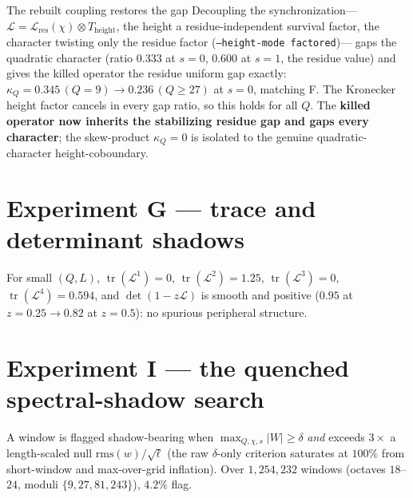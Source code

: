 \documentclass[11pt]{article}
\newcommand{\Lcal}{\mathcal{L}}
\DeclareMathOperator{\tr}{tr}
\theoremstyle{plain}
\theoremstyle{remark}
\begin{document}
\begin{findingbox}{The rebuilt coupling restores the gap}
Decoupling the synchronization---$\Lcal=\Lcal_{\mathrm{res}}(\chi)\otimes
T_{\mathrm{height}}$, the height a residue-independent survival factor, the
character twisting only the residue factor (\texttt{--height-mode factored})---%
gaps the quadratic character (ratio $0.333$ at $s{=}0$, $0.600$ at $s{=}1$, the
residue value) and gives the killed operator the residue uniform gap exactly:
$\kappa_Q=0.345\,(Q{=}9)\to0.236\,(Q\ge27)$ at $s{=}0$, matching F. The Kronecker
height factor cancels in every gap ratio, so this holds for all $Q$. The
\textbf{killed operator now inherits the stabilizing residue gap and gaps every
character}; the skew-product $\kappa_Q=0$ is isolated to the genuine
quadratic-character height-coboundary.
\end{findingbox}

\section{Experiment G --- trace and determinant shadows}

For small $(Q,L)$, $\tr(\Lcal^1)=0$, $\tr(\Lcal^2)=1.25$, $\tr(\Lcal^3)=0$,
$\tr(\Lcal^4)=0.594$, and $\det(1-z\Lcal)$ is smooth and positive
($0.95$ at $z{=}0.25\to0.82$ at $z{=}0.5$): no spurious peripheral structure.

\section{Experiment I --- the quenched spectral-shadow search}

A window is flagged shadow-bearing when $\max_{Q,\chi,s}\lvert W\rvert\ge\delta$
\emph{and} exceeds $3\times$ a length-scaled null $\mathrm{rms}(w)/\sqrt{\ell}$
(the raw $\delta$-only criterion saturates at $100\%$ from short-window and
max-over-grid inflation). Over $1{,}254{,}232$ windows (octaves $18$--$24$,
moduli $\{9,27,81,243\}$), $4.2\%$ flag.
\end{document}
